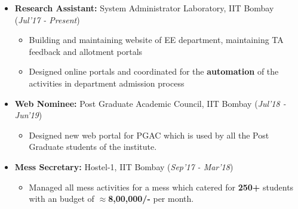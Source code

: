 \documentclass[10pt]{article}
\begin{document}
\colorbox{bl}{}

\begin{itemize}[leftmargin=0.4cm]
\vspace{-0.2cm}

\item \textbf {Research Assistant:} System Administrator Laboratory, IIT Bombay \hfill{(\textit{Jul'17 - Present})}\\[-0.7cm]
        \begin{itemize}
    \item Building and maintaining website of EE department, maintaining TA feedback and allotment portals\vspace{-0.1cm}
    \item Designed online portals and coordinated for the \textbf{automation} of the activities in department admission process
    \end{itemize}
    \vspace{-0.3cm}


\item \textbf{Web Nominee:} Post Graduate Academic Council, IIT Bombay \hfill{(\textit{Jul'18 - Jun'19})}\\[-0.65cm]
\begin{itemize}
\item Designed new web portal for PGAC which is used by all the Post Graduate students of the institute. \vspace{-0.25cm}

\end{itemize}

\item \textbf{Mess Secretary:
 }  Hostel-1, IIT Bombay   \hfill{(\textit{Sep'17 - Mar'18})}\\[-0.65cm]
 \begin{itemize}
\item Managed all mess activities for a mess which catered for \textbf{250+} students with an budget of \textbf{$\approx$8,00,000/-} per month.\vspace{-0.25cm}

\end{itemize}

\vspace{-0.05cm}
\end{itemize}
\end{document}

